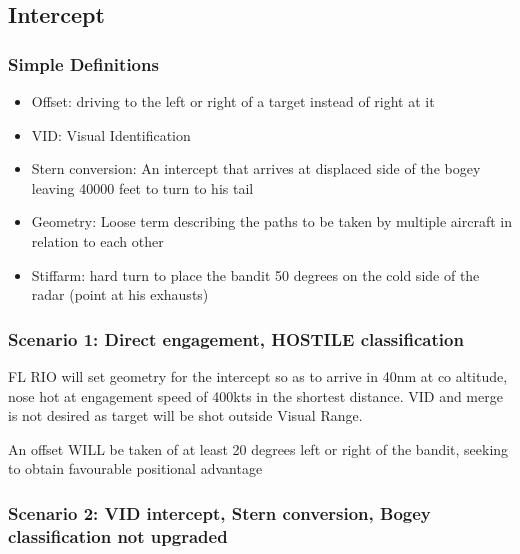 \subsection{Intercept}

\subsubsection*{Simple Definitions}

\begin{itemize}
  \item Offset: driving to the left or right of a target instead of right at it

  \item VID: Visual Identification

  \item Stern conversion: An intercept that arrives at displaced side of the
    bogey leaving 40000 feet to turn to his tail

  \item Geometry: Loose term describing the paths to be taken by multiple
    aircraft in relation to each other

  \item Stiffarm: hard turn to place the bandit 50 degrees on the cold side of
    the radar (point at his exhausts)

\end{itemize}

\subsubsection*{Scenario 1: Direct engagement, HOSTILE classification}

FL RIO will set geometry for the intercept so as to arrive in 40nm at co
altitude, nose hot at engagement speed of 400kts in the shortest distance. VID
and merge is not desired as target will be shot outside Visual Range.

An offset WILL be taken of at least 20 degrees left or right of the bandit,
seeking to obtain favourable positional advantage

\subsubsection*{Scenario 2: VID intercept, Stern conversion, Bogey
  classification not upgraded}

